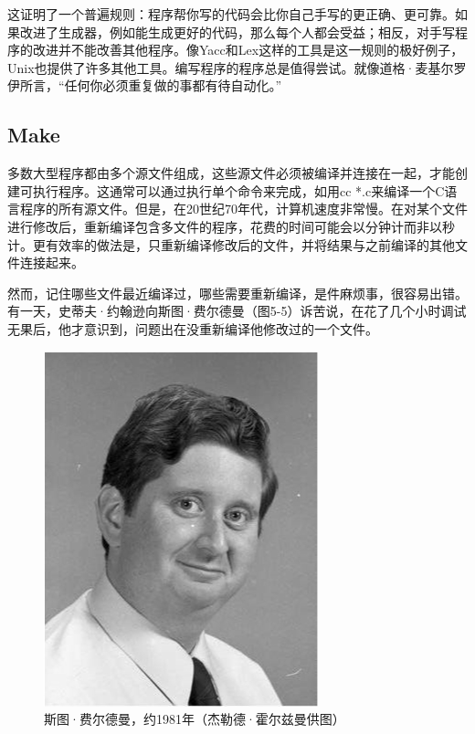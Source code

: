 \documentclass[a4paper,12pt,UTF8,twoside]{ctexbook}
\begin{document}
这证明了一个普遍规则：程序帮你写的代码会比你自己手写的更正确、更可靠。如果改进了生成器，例如能生成更好的代码，那么每个人都会受益；相反，对手写程序的改进并不能改善其他程序。像Yacc和Lex这样的工具是这一规则的极好例子，Unix也提供了许多其他工具。编写程序的程序总是值得尝试。就像道格·麦基尔罗伊所言，“任何你必须重复做的事都有待自动化。”

\subsection{Make}

多数大型程序都由多个源文件组成，这些源文件必须被编译并连接在一起，才能创建可执行程序。这通常可以通过执行单个命令来完成，如用cc *.c来编译一个C语言程序的所有源文件。但是，在20世纪70年代，计算机速度非常慢。在对某个文件进行修改后，重新编译包含多文件的程序，花费的时间可能会以分钟计而非以秒计。更有效率的做法是，只重新编译修改后的文件，并将结果与之前编译的其他文件连接起来。

然而，记住哪些文件最近编译过，哪些需要重新编译，是件麻烦事，很容易出错。有一天，史蒂夫·约翰逊向斯图·费尔德曼（图5-5）诉苦说，在花了几个小时调试无果后，他才意识到，问题出在没重新编译他修改过的一个文件。

\begin{figure}[htbp]
	\centering
	\includegraphics[width=0.7\linewidth]{44}
	\caption{斯图·费尔德曼，约1981年（杰勒德·霍尔兹曼供图）}
	\label{fig:1}
\end{figure}
\end{document}
